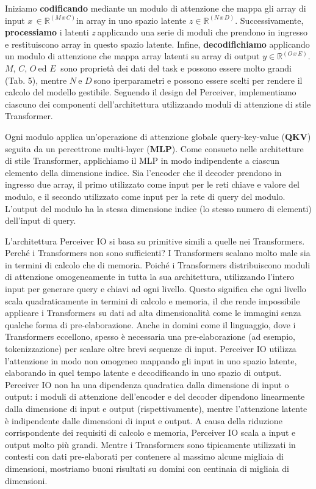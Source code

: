 \documentclass[
  11pt,
]{article}
\begin{document}
Iniziamo \textbf{codificando} mediante un modulo di attenzione che mappa
gli array di input \(x\, \in \mathbb{R}^{(M\, x\, C)}\)in array in uno
spazio latente \(z \in \mathbb{R}^{(N\, x\, D)}\). Successivamente,
\textbf{processiamo} i latenti \(z\ \)applicando una serie di moduli che
prendono in ingresso e restituiscono array in questo spazio latente.
Infine, \textbf{decodifichiamo} applicando un modulo di attenzione che
mappa array latenti su array di output
\(y \in \mathbb{R}^{(O\, x\, E)}\). \(M,\, C,\, O\ \)ed \(E\ \) sono
proprietà dei dati del task e possono essere molto grandi (Tab. 5),
mentre \(N\ \)e \(D\ \)sono iperparametri e possono essere scelti per
rendere il calcolo del modello gestibile. Seguendo il design del
Perceiver, implementiamo ciascuno dei componenti
dell'architettura utilizzando moduli di attenzione di
stile Transformer.

Ogni modulo applica un'operazione di attenzione globale
query-key-value (\textbf{QKV}) seguita da un percettrone multi-layer
(\textbf{MLP}). Come consueto nelle architetture di stile Transformer,
applichiamo il MLP in modo indipendente a ciascun elemento della
dimensione indice. Sia l'encoder che il decoder prendono
in ingresso due array, il primo utilizzato come input per le reti chiave
e valore del modulo, e il secondo utilizzato come input per la rete di
query del modulo. L'output del modulo ha la stessa
dimensione indice (lo stesso numero di elementi)
dell'input di query.

L'architettura Perceiver IO si basa su primitive simili
a quelle nei Transformers. Perché i Transformers non sono sufficienti? I
Transformers scalano molto male sia in termini di calcolo che di
memoria. Poiché i Transformers distribuiscono moduli di attenzione
omogeneamente in tutta la sua architettura, utilizzando
l'intero input per generare query e chiavi ad ogni
livello. Questo significa che ogni livello scala quadraticamente in
termini di calcolo e memoria, il che rende impossibile applicare i
Transformers su dati ad alta dimensionalità come le immagini senza
qualche forma di pre-elaborazione. Anche in domini come il linguaggio,
dove i Transformers eccellono, spesso è necessaria una pre-elaborazione
(ad esempio, tokenizzazione) per scalare oltre brevi sequenze di input.
Perceiver IO utilizza l'attenzione in modo non omogeneo
mappando gli input in uno spazio latente, elaborando in quel tempo
latente e decodificando in uno spazio di output. Perceiver IO non ha una
dipendenza quadratica dalla dimensione di input o output: i moduli di
attenzione dell'encoder e del decoder dipendono
linearmente dalla dimensione di input e output (rispettivamente), mentre
l'attenzione latente è indipendente dalle dimensioni di
input e output. A causa della riduzione corrispondente dei requisiti di
calcolo e memoria, Perceiver IO scala a input e output molto più grandi.
Mentre i Transformers sono tipicamente utilizzati in contesti con dati
pre-elaborati per contenere al massimo alcune migliaia di dimensioni,
mostriamo buoni risultati su domini con centinaia di migliaia di
dimensioni.
\end{document}
